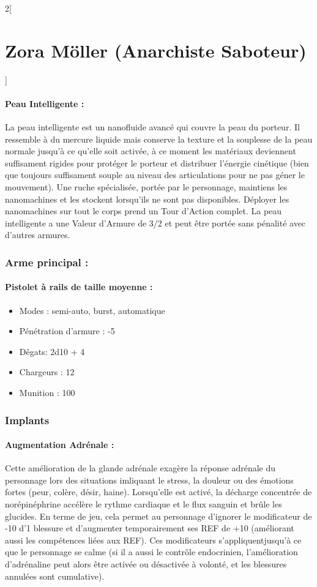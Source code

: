 \documentclass[a4paper,9pt]{article}
\begin{document}
\begin{multicols}{2}[\section*{Zora Möller (Anarchiste Saboteur)}]
   \paragraph{Peau Intelligente :} La peau intelligente est un nanofluide avancé qui
   couvre la peau du porteur. Il ressemble à du mercure liquide mais conserve la
   texture et la souplesse de la peau normale jusqu'à ce qu'elle soit activée, à
   ce moment les matériaux deviennent suffisament rigides pour protéger le porteur
   et distribuer l'énergie cinétique (bien que toujours suffisament souple au
   niveau des articulations pour ne pas géner le mouvement). Une ruche
   spécialisée, portée par le personnage, maintiens les nanomachines et les
   stockent lorsqu'ils ne sont pas disponibles. Déployer les nanomachines sur tout
   le corps prend un Tour d'Action complet. La peau intelligente a une Valeur
   d'Armure de 3/2 et peut être portée sans pénalité avec d'autres armures.

   \subsubsection*{Arme principal :}
   \paragraph{Pistolet à rails de taille moyenne :}
   \begin{itemize}
      \item Modes : semi-auto, burst, automatique
      \item Pénétration d'armure : -5
      \item Dêgats: 2d10 + 4
      \item Chargeurs : 12
      \item Munition : 100
   \end{itemize}

   \subsubsection*{Implants}

   \paragraph{Augmentation Adrénale :} Cette amélioration de la glande adrénale
   exagère la réponse adrénale du personnage lors des situations imliquant le
   stress, la douleur ou des émotions fortes (peur, colère, désir, haine).
   Lorsqu'elle est activé, la décharge concentrée de norépinéphrine accélère le
   rythme cardiaque et le flux sanguin et brûle les glucides. En terme de jeu,
   cela permet au personnage d'ignorer le modificateur de -10 d'1 blessure et
   d'augmenter temporairement ses REF de +10 (améliorant aussi les compétences
   liées aux REF). Ces modificateurs s'appliquentjusqu'à ce que le personnage se
   calme (si il a aussi le contrôle endocrinien, l'amélioration d'adrénaline peut
   alors être activée ou désactivée à volonté, et les blessures annulées sont
   cumulative).


\end{multicols}
\end{document}
